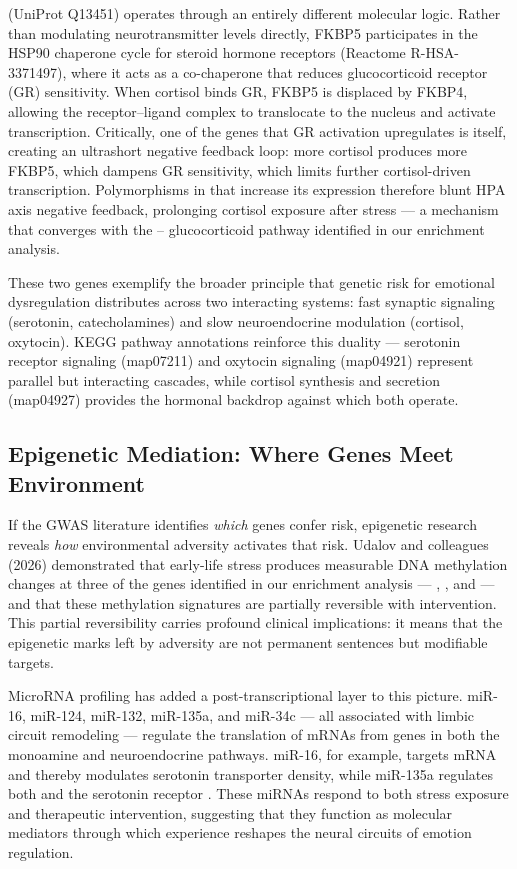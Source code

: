  (UniProt Q13451) operates through an entirely different molecular
logic.
Rather than modulating neurotransmitter levels directly, FKBP5 participates in
the HSP90 chaperone cycle for steroid hormone receptors
(Reactome R-HSA-3371497), where it acts as a co-chaperone that reduces
glucocorticoid receptor (GR) sensitivity.
When cortisol binds GR, FKBP5 is displaced by FKBP4, allowing the
receptor--ligand complex to translocate to the nucleus and activate
transcription.
Critically, one of the genes that GR activation upregulates is 
itself, creating an ultrashort negative feedback loop: more cortisol produces
more FKBP5, which dampens GR sensitivity, which limits further cortisol-driven
transcription.
Polymorphisms in  that increase its expression therefore blunt HPA
axis negative feedback, prolonging cortisol exposure after stress — a mechanism
that converges with the -- glucocorticoid pathway
identified in our enrichment analysis.

These two genes exemplify the broader principle that genetic risk for emotional
dysregulation distributes across two interacting systems: fast synaptic
signaling (serotonin, catecholamines) and slow neuroendocrine modulation
(cortisol, oxytocin).
KEGG pathway annotations reinforce this duality — serotonin receptor signaling
(map07211) and oxytocin signaling (map04921) represent parallel but interacting
cascades, while cortisol synthesis and secretion (map04927) provides the
hormonal backdrop against which both operate.

\subsection*{Epigenetic Mediation: Where Genes Meet Environment}

If the GWAS literature identifies \emph{which} genes confer risk, epigenetic
research reveals \emph{how} environmental adversity activates that risk.
Udalov and colleagues (2026) demonstrated that early-life stress produces
measurable DNA methylation changes at three of the genes identified in our
enrichment analysis — , , and  — and that
these methylation signatures are partially reversible with
intervention.
This partial reversibility carries profound clinical implications: it means that
the epigenetic marks left by adversity are not permanent sentences but
modifiable targets.

MicroRNA profiling has added a post-transcriptional layer to this picture.
miR-16, miR-124, miR-132, miR-135a, and miR-34c — all associated with limbic
circuit remodeling — regulate the translation of mRNAs from genes in both the
monoamine and neuroendocrine pathways.
miR-16, for example, targets  mRNA and thereby modulates
serotonin transporter density, while miR-135a regulates both  and
the serotonin receptor .
These miRNAs respond to both stress exposure and therapeutic intervention,
suggesting that they function as molecular mediators through which experience
reshapes the neural circuits of emotion regulation.

